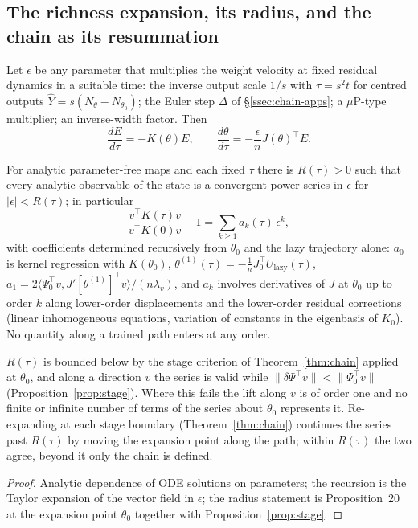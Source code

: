 \subsection{The richness expansion, its radius, and the chain as its resummation}
\label{ssec:chain-richness}

Let $\epsilon$ be any parameter that multiplies the weight velocity at fixed
residual dynamics in a suitable time: the inverse output scale $1/s$ with
$\tau=s^2t$ for centred outputs $\hat Y=s(N_\theta-N_{\theta_0})$; the Euler step
$\Delta$ of \S\ref{ssec:chain-apps}; a $\mu$P-type multiplier; an inverse-width
factor. Then
\[
\frac{dE}{d\tau}=-K(\theta)E,\qquad\frac{d\theta}{d\tau}=-\frac{\epsilon}{n}J(\theta)^{\!\top}E .
\]

\begin{theorem}
\label{thm:richness}
For analytic parameter-free maps and each fixed $\tau$ there is $R(\tau)>0$ such
that every analytic observable of the state is a convergent power series in
$\epsilon$ for $|\epsilon|<R(\tau)$; in particular
\[
\frac{v^{\!\top}K(\tau)v}{v^{\!\top}K(0)v}-1=\sum_{k\ge1}a_k(\tau)\,\epsilon^k ,
\]
with coefficients determined recursively from $\theta_0$ and the lazy
trajectory alone: $a_0$ is kernel regression with $K(\theta_0)$,
$\theta^{(1)}(\tau)=-\frac1nJ_0^{\!\top}U_{\mathrm{lazy}}(\tau)$,
$a_1=2\langle\Psi_0^{\!\top}v,J'[\theta^{(1)}]^{\!\top}v\rangle/(n\lambda_v)$, and $a_k$
involves derivatives of $J$ at $\theta_0$ up to order $k$ along lower-order
displacements and the lower-order residual corrections (linear inhomogeneous
equations, variation of constants in the eigenbasis of $K_0$). No quantity along
a trained path enters at any order.
\end{theorem}

\begin{theorem}
\label{thm:radius}
$R(\tau)$ is bounded below by the stage criterion of Theorem~\ref{thm:chain}
applied at $\theta_0$, and along a direction $v$ the series is valid while
$\|\delta\Psi^{\!\top}v\|<\|\Psi_0^{\!\top}v\|$ (Proposition~\ref{prop:stage}). Where
this fails the lift along $v$ is of order one and no finite or infinite number
of terms of the series about $\theta_0$ represents it. Re-expanding at each
stage boundary (Theorem~\ref{thm:chain}) continues the series past $R(\tau)$
by moving the expansion point along the path; within $R(\tau)$ the two agree,
beyond it only the chain is defined.
\end{theorem}
\begin{proof}
Analytic dependence of ODE solutions on parameters; the recursion is the Taylor
expansion of the vector field in $\epsilon$; the radius statement is
Proposition~20 at the expansion point $\theta_0$ together with
Proposition~\ref{prop:stage}.
\end{proof}

